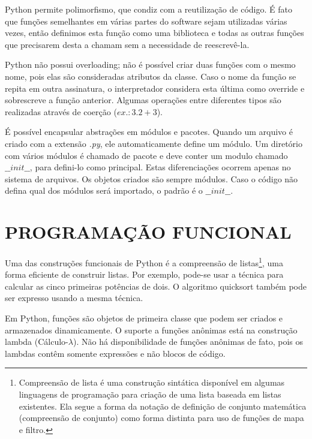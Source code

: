 \par Python permite polimorfismo, que condiz com a reutilização de código.
É fato que funções semelhantes em várias partes do software sejam utilizadas várias vezes, então definimos esta função como uma biblioteca e todas as outras funções que precisarem desta a chamam sem a necessidade de reescrevê-la.

\par Python não possui overloading; não é possível criar duas funções com o mesmo nome, pois elas são consideradas atributos da classe.
Caso o nome da função se repita em outra assinatura, o interpretador considera esta última como override e sobrescreve a função anterior.
Algumas operações entre diferentes tipos são realizadas através de coerção ($ex.: 3.2 + 3$).

\par É possível encapsular abstrações em módulos e pacotes. Quando um arquivo é criado com a extensão \textit{.py}, ele automaticamente define um módulo.
Um diretório com vários módulos é chamado de pacote e deve conter um modulo chamado $\_\_init\_\_$, para defini-lo como principal.
Estas diferenciações ocorrem apenas no sistema de arquivos. Os objetos criados são sempre módulos.
Caso o código não defina qual dos módulos será importado, o padrão é o $\_\_init\_\_$.

\section{PROGRAMAÇÃO FUNCIONAL}
Uma das construções funcionais de Python é a compreensão de listas\footnote{
    Compreensão de lista é uma construção sintática disponível em algumas linguagens de programação para criação de uma lista baseada em listas existentes.
    Ela segue a forma da notação de definição de conjunto matemática (compreensão de conjunto) como forma distinta para uso de funções de mapa e filtro. 
}, uma forma eficiente de construir listas.
Por exemplo, pode-se usar a técnica para calcular as cinco primeiras potências de dois.
O algoritmo quicksort também pode ser expresso usando a mesma técnica.

Em Python, funções são objetos de primeira classe que podem ser criados e armazenados dinamicamente.
O suporte a funções anônimas está na construção lambda (Cálculo-$\lambda$).
Não há disponibilidade de funções anônimas de fato, pois os lambdas contêm somente expressões e não blocos de código.

